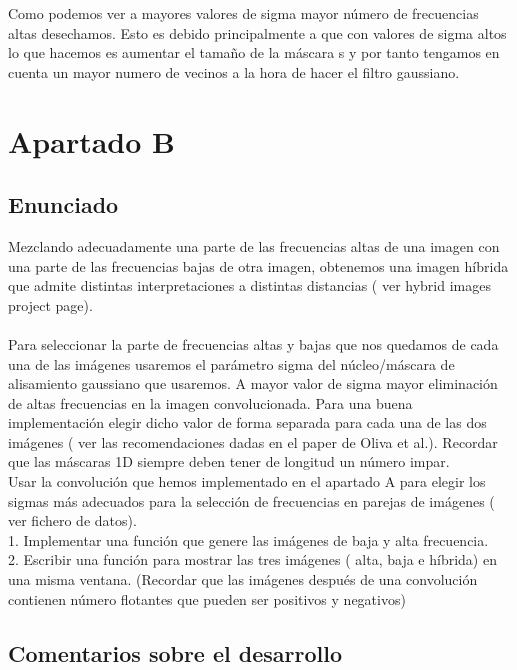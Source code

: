 Como podemos ver a mayores valores de sigma mayor número de frecuencias altas desechamos. Esto es debido principalmente a que con valores de sigma altos lo que hacemos es aumentar el tamaño de la máscara s y por tanto tengamos en cuenta un mayor numero de vecinos a la hora de hacer el filtro gaussiano.

\newpage
\section{Apartado B}

\subsection{Enunciado}

Mezclando adecuadamente  una parte de las frecuencias altas de una  
imagen con una parte de las frecuencias bajas de  otra imagen,  obtenemos una imagen híbrida que admite distintas interpretaciones a  distintas distancias ( ver hybrid images project page).\\
\\   
Para seleccionar la parte de frecuencias altas  y bajas que nos quedamos  de cada una de las imágenes usaremos el parámetro sigma del   núcleo/máscara de alisamiento gaussiano que usaremos. A mayor valor  
de sigma mayor eliminación de altas frecuencias en la imagen  
convolucionada. Para una buena implementación elegir dicho valor de  forma separada para cada una de las dos  imágenes ( ver las  
recomendaciones dadas en el paper de Oliva et al.). Recordar que las  máscaras 1D siempre deben tener de longitud un número impar.\\   

Usar la convolución que hemos implementado en el apartado A para  elegir los sigmas más adecuados para la selección de frecuencias en  parejas de imágenes ( ver fichero de datos). \\ 
1.   Implementar una función que genere las imágenes de baja y  
alta frecuencia.\\ 
2.   Escribir una función para mostrar las tres imágenes ( alta,  
baja e híbrida) en una misma ventana. (Recordar que las  
imágenes después de una convolución contienen número  
flotantes que pueden ser positivos y negativos)

\subsection{Comentarios sobre el desarrollo}


